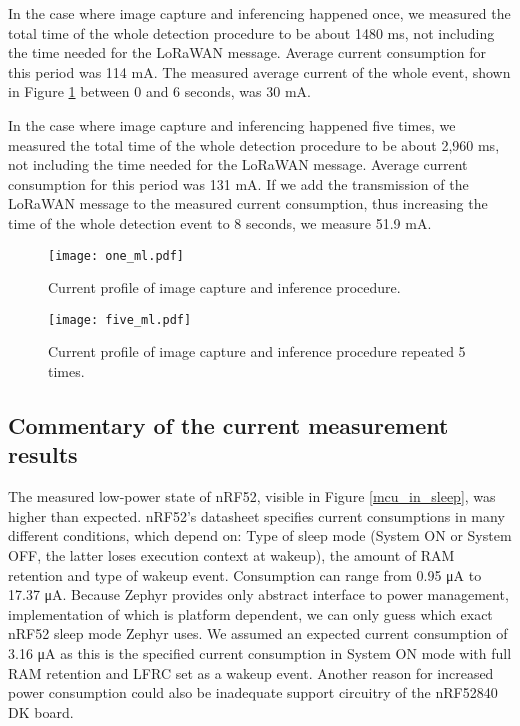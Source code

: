 In the case where image capture and inferencing happened once, we measured the total time of the whole detection procedure to be about 1480 \si{\milli\second}, not including the time needed for the LoRaWAN message.
Average current consumption for this period was 114 \si{\milli\ampere}.
The measured average current of the whole event, shown in Figure \ref{one_ml} between 0 and 6 seconds, was 30 \si{\milli\ampere}.

In the case where image capture and inferencing happened five times, we measured the total time of the whole detection procedure to be about 2,960 \si{\milli\second}, not including the time needed for the LoRaWAN message.
Average current consumption for this period was 131 \si{\milli\ampere}.
If we add the transmission of the LoRaWAN message to the measured current consumption, thus increasing the time of the whole detection event to 8 seconds, we measure 51.9 \si{\milli\ampere}.

\begin{figure}[ht]
    \centering
    \texttt{[image: one\_ml.pdf]}
    \caption{ Current profile of image capture and inference procedure.}
    \label{one_ml}
\end{figure}
\begin{figure}[ht]
    \centering
    \texttt{[image: five\_ml.pdf]}
    \caption{ Current profile of image capture and inference procedure repeated 5 times.}
    \label{five_ml}
\end{figure}

\subsection{ Commentary of the current measurement results}

The measured low-power state of nRF52, visible in Figure \ref{mcu_in_sleep}, was higher than expected.
nRF52's datasheet\cite{nrf52_datasheet} specifies current consumptions in many different conditions, which depend on: Type of sleep mode (System ON or System OFF, the latter loses execution context at wakeup), the amount of RAM retention and type of wakeup event.
Consumption can range from 0.95 \si{\micro\ampere} to 17.37 \si{\micro\ampere}.
Because Zephyr provides only abstract interface to power management, implementation of which is platform dependent, we can only guess which exact nRF52 sleep mode Zephyr uses.
We assumed an expected current consumption of 3.16 \si{\micro\ampere} as this is the specified current consumption in System ON mode with full RAM retention and LFRC set as a wakeup event.
Another reason for increased power consumption could also be inadequate support circuitry of the nRF52840 DK board.


